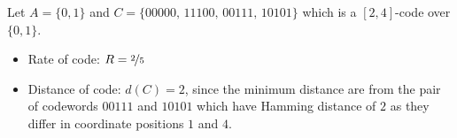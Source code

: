 \begin{exbox}
    \begin{example}
        Let $ A=\{0,1\} $ and $ C=\{00000,\,11100,\,00111,\,10101\} $ which is a
        $ [2,4] $-code over $ \{0,1\} $.
        \begin{itemize}
            \item Rate of code: $ R=\nicefrac{2}{5} $
            \item Distance of code: $ d(C)=2 $, since the minimum distance
                  are from the pair of codewords $ 00111 $ and $ 10101 $ which
                  have Hamming distance of $ 2 $ as they differ in coordinate
                  positions $ 1 $ and $ 4 $.
        \end{itemize}
    \end{example}
\end{exbox}